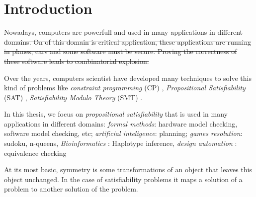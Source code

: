 \chapter{Introduction}\label{chap:intro}


\st{Nowadays, computers are powerfull and used in many applications in different domains.
On of this domain is critical application, these applications are running in planes, cars
and some software must be secure. Proving the correctness of these software leads
to combinatorial explosion.
}

Over the years, computers scientist have developed many techniques to solve 
this kind of problems like \emph{constraint programming} (CP) \cite{rossi2006handbook},
\emph{Propositional Satisfiability} (SAT) \cite{biere2009handbook},
\emph{Satisfiability Modulo Theory} (SMT) \cite{barrett2018satisfiability}.

In this thesis, we focus on \emph{propositional satisfiability} that is used in many
applications in different domains: \emph{formal methods}: hardware model checking,
software model checking, etc; \emph{artificial inteligence}: planning; \emph{games resolution}:
sudoku, n-queens, \emph{Bioinformatics} : Haplotype inference,
\emph{design automation} : equivalence checking
 



At its most basic, symmetry is some transformations of an object that leaves this 
object unchanged. In the case of satisfiability problems it maps a solution of a problem to another
solution of the problem.





